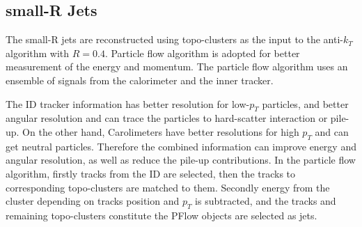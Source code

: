 \subsection{small-R Jets}
The small-R jets are reconstructed using topo-clusters as the input to the anti-$k_T$ algorithm with $R = 0.4$. Particle flow algorithm \cite{PERF-2015-09} is adopted for better measurement of the energy and momentum. The particle flow algorithm uses an ensemble of signals from the calorimeter and the inner tracker. 

The ID tracker information has better resolution for low-$p_T$ particles, and better angular resolution and can trace the particles to hard-scatter
interaction or pile-up. On the other hand, Carolimeters have better resolutions for high $p_T$ and can get neutral particles. Therefore the combined information can improve energy and angular resolution, as well as reduce the pile-up contributions.
In the particle flow algorithm, firstly tracks from the ID are selected, then the tracks to corresponding topo-clusters are matched to them. Secondly energy from the cluster depending on tracks position and $p_T$ is subtracted, and the tracks and remaining topo-clusters constitute the PFlow objects are selected as jets.

